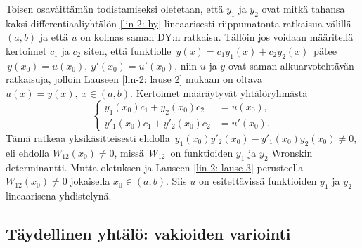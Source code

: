Toisen osaväittämän todistamiseksi oletetaan, että $y_1$ ja $y_2$ ovat mitkä tahansa kaksi 
differentiaaliyhtälön \eqref{lin-2: hy} lineaarisesti riippumatonta ratkaisua välillä $(a,b)$
ja että $u$ on kolmas saman DY:n ratkaisu. Tällöin jos voidaan määritellä kertoimet $c_1$ ja 
$c_2$ siten, että funktiolle $\,y(x)=c_1y_1(x)+c_2y_2(x)\,$ pätee 
$\,y(x_0)=u(x_0),\ y'(x_0)=u'(x_0)$, niin $u$ ja $y$ ovat saman alkuarvotehtävän ratkaisuja,
jolloin Lauseen \ref{lin-2: lause 2} mukaan on oltava $u(x)=y(x),\ x\in(a,b)$. Kertoimet
määräytyvät yhtälöryhmästä
\[ \left\{ \begin{aligned}
y_1(x_0)c_1+y_2(x_0)c_2 &= u(x_0), \\ y'_1(x_0)c_1+y'_2(x_0)c_2 &= u'(x_0).
           \end{aligned} \right. \]
Tämä ratkeaa yksikäsitteisesti ehdolla $\,y_1(x_0)y'_2(x_0)-y'_1(x_0)y_2(x_0) \neq 0$, eli
ehdolla $W_{12}(x_0) \neq 0$, missä $\,W_{12}\,$ on funktioiden $y_1$ ja $y_2$ Wronskin
determinantti. Mutta oletuksen ja Lauseen \ref{lin-2: lause 3} perusteella
$W_{12}(x_0) \neq 0$ jokaisella $x_0\in(a,b)$. Siis $u$ on esitettävissä funktioiden $y_1$ ja
$y_2$ lineaarisena yhdistelynä. \loppu

\subsection*{Täydellinen yhtälö: vakioiden variointi}

